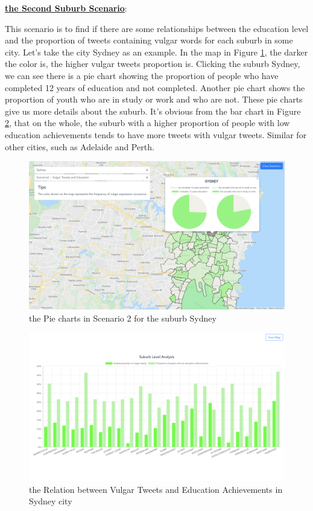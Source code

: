 \documentclass{article}
\begin{document}
\textbf{\underline{the Second Suburb Scenario}}: 

This scenario is to find if there are some relationships between the education level and the proportion of tweets containing vulgar words for each suburb in some city. Let’s take the city Sydney as an example. In the map in Figure
\ref{fig:Sydney_pie_chart}, the darker the color is, the higher vulgar tweets proportion is. Clicking the suburb Sydney, we can see there is a pie chart showing the proportion of people who have completed 12 years of education and not completed. Another pie chart shows the proportion of youth who are in study or work and who are not. These pie charts give us more details about the suburb. It’s obvious from the bar chart in Figure
\ref{fig:Sydney_histogram}, that on the whole, the suburb with a higher proportion of people with low education achievements tends to have more tweets with vulgar tweets. Similar for other cities, such as Adelaide and Perth.

\begin{figure}[htp]
\centering
\includegraphics[width=\textwidth]{img/Sydney_pie_chart.jpg}
\caption{the Pie charts in Scenario 2 for the suburb Sydney}
\label{fig:Sydney_pie_chart}
\end{figure}

\begin{figure}[htp]
\centering
\includegraphics[width=\textwidth]{img/Sydney_histogram.jpg}
\caption{the Relation between Vulgar Tweets and Education Achievements in Sydney city}
\label{fig:Sydney_histogram}
\end{figure}
\end{document}
